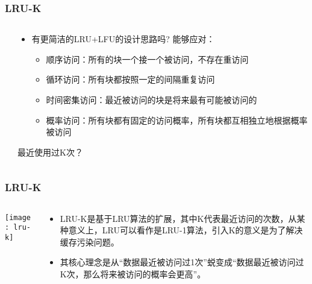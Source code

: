 \begin{frame}[plain]
	\frametitle{LRU-K}
	\begin{columns}
		\begin{column}{.1\textwidth}
			\centering
		\end{column}
		
		\begin{column}{.9\textwidth}
			
			\begin{itemize}
				\item 有更简洁的LRU+LFU的设计思路吗? 能够应对：
				\begin{itemize}
					
					\item 顺序访问：所有的块一个接一个被访问，不存在重访问
					\item 循环访问：所有块都按照一定的间隔重复访问
					\item 时间密集访问：最近被访问的块是将来最有可能被访问的
					\item 概率访问：所有块都有固定的访问概率，所有块都互相独立地根据概率被访问
					
					
				\end{itemize}
			\end{itemize}
		\centering
			最近使用过K次？
			
		\end{column}
		
		
	\end{columns}
\end{frame}



\begin{frame}[plain]
	\frametitle{LRU-K}
	\begin{columns}
		\begin{column}{.4\textwidth}
			\centering
			\texttt{[image: lru-k]}
		\end{column}
		
		\begin{column}{.6\textwidth}
			
				\begin{itemize}
					
					\item LRU-K是基于LRU算法的扩展，其中K代表最近访问的次数，从某种意义上，LRU可以看作是LRU-1算法，引入K的意义是为了解决缓存污染问题。
					\item 其核心理念是从“数据最近被访问过1次”蜕变成“数据最近被访问过K次，那么将来被访问的概率会更高”。
					
					
				\end{itemize}
			
			
		\end{column}
		
		
	\end{columns}
\end{frame}



